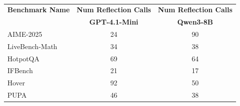 \documentclass{article} %
\begin{document}
\begin{table}[ht]
    \centering
    \caption{}
    \label{tab:reflection_calls}
    \begin{tabular}{lcc}
        \toprule
        \textbf{Benchmark Name} & \textbf{Num Reflection Calls} & \textbf{Num Reflection Calls} \\
                                & \textbf{GPT-4.1-Mini}         & \textbf{Qwen3-8B} \\
        \midrule
        AIME-2025      & 24 & 90 \\
        LiveBench-Math & 34 & 38 \\
        HotpotQA       & 69 & 64 \\
        IFBench        & 21 & 17 \\
        Hover          & 92 & 50 \\
        PUPA           & 46 & 38 \\
        \bottomrule
    \end{tabular}
\end{table}
\end{document}
